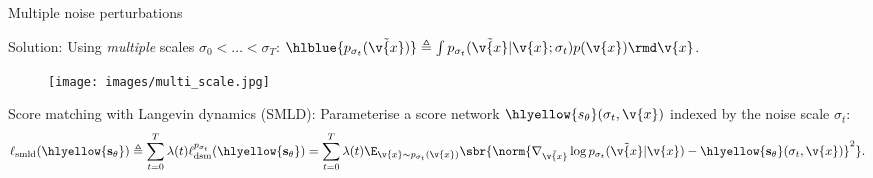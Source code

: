 \begin{frame}{Multiple noise  perturbations \cite{song2019generative,song2020improved}}

Solution: Using \textit{multiple} scales $ \sigma_0 < \dots < \sigma_T$: 
$\hlblue{p_{\sigma_t}(\tilde{\v{x}})} \triangleq \int p_{\sigma_t}(\tilde{\v{x}} | \v{x}; \sigma_t) p(\v{x}) \rmd \v{x}$.
\begin{figure}
    \centering
    \texttt{[image: images/multi\_scale.jpg]}
\end{figure}
\vspace{-0.5em}
Score matching with Langevin dynamics (SMLD):
Parameterise a score network $\hlyellow{s_\theta}(\sigma_t, \v{x})$ indexed by the noise scale $\sigma_t$:
\vspace{-0.5em}
\begin{equation*}
    \ell_{\mathrm{smld}}(\hlyellow{\mathbf{s_\theta}}) 
    \triangleq \sum_{t=0}^T \lambda(t) \ell_{\mathrm{dsm}}^{p_{\sigma_t}}(\hlyellow{\mathbf{s}_\theta}) 
    = \sum_{t=0}^T \lambda(t) \E_{\v{x} \sim p_{\sigma_t}(\v{x})} \sbr{\norm{\nabla_{\tilde{\v{x}}} \log p_{\sigma_t}(\tilde{\v{x}} | \v{x}) - \hlyellow{\mathbf{s_\theta}}(\sigma_t, \v{x})}^2}.
\end{equation*}
\end{frame}

